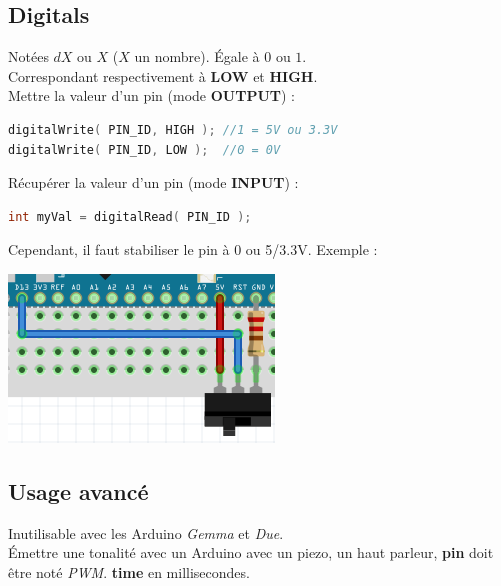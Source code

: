         \subsection{Digitals}

            \bmar
                Notées $dX$ ou $X$ ($X$ un nombre). Égale à $0$ ou $1$.\\
                Correspondant respectivement à \textbf{LOW} et \textbf{HIGH}.\\

                Mettre la valeur d'un pin (mode \textbf{OUTPUT}) :
            \emar

            \begin{lstlisting}[language=C]
digitalWrite( PIN_ID, HIGH ); //1 = 5V ou 3.3V
digitalWrite( PIN_ID, LOW );  //0 = 0V
            \end{lstlisting}

            \bmar
                Récupérer la valeur d'un pin (mode \textbf{INPUT}) :
            \emar

            \begin{lstlisting}[language=C]
int myVal = digitalRead( PIN_ID );
            \end{lstlisting}

            \bmar
                Cependant, il faut stabiliser le pin à 0 ou 5/3.3V. Exemple :
            \emar

            \begin{center}
                \includegraphics[scale=0.5]{img/arduino-1}
            \end{center}


        \subsection{Usage avancé}
            \bmar
                Inutilisable avec les Arduino \textit{Gemma} et \textit{Due}.\\
                Émettre une tonalité avec un Arduino avec un piezo, un haut parleur,
                \textbf{pin} doit être noté \textit{PWM}. \textbf{time} en millisecondes.
            \emar

